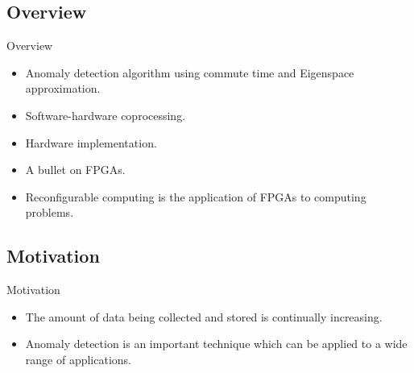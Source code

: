 \subsection{Overview}
\begin{frame}[label=overview]{Overview}
    \begin{itemize}
        \item Anomaly detection algorithm using commute time and Eigenspace
            approximation.
        \item Software-hardware coprocessing.
        \item Hardware implementation.
        \item A bullet on FPGAs.
        \item Reconfigurable computing is the application of FPGAs to computing problems.
    \end{itemize}
\end{frame}

\subsection{Motivation}
\begin{frame}[label=motivation]{Motivation}
    \begin{itemize}
        \item The amount of data being collected and stored is continually
            increasing.
        \item Anomaly detection is an important technique which can be applied
            to a wide range of applications.
    \end{itemize}
\end{frame}


